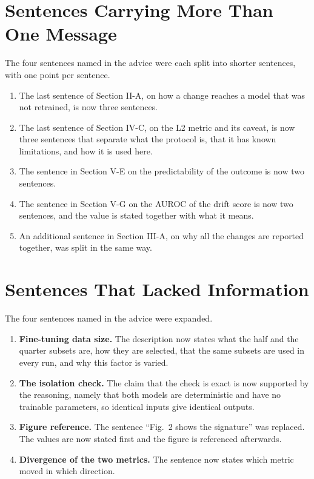 \documentclass[11pt,a4paper]{article}
\begin{document}
\section{Sentences Carrying More Than One Message}
The four sentences named in the advice were each split into shorter sentences,
with one point per sentence.

\begin{enumerate}[leftmargin=*]
\item The last sentence of Section II-A, on how a change reaches a model that was
not retrained, is now three sentences.
\item The last sentence of Section IV-C, on the L2 metric and its caveat, is now
three sentences that separate what the protocol is, that it has known limitations,
and how it is used here.
\item The sentence in Section V-E on the predictability of the outcome is now two
sentences.
\item The sentence in Section V-G on the AUROC of the drift score is now two
sentences, and the value is stated together with what it means.
\item An additional sentence in Section III-A, on why all the changes are reported
together, was split in the same way.
\end{enumerate}

\section{Sentences That Lacked Information}
The four sentences named in the advice were expanded.

\begin{enumerate}[leftmargin=*]
\item \textbf{Fine-tuning data size.} The description now states what the half and
the quarter subsets are, how they are selected, that the same subsets are used in
every run, and why this factor is varied.
\item \textbf{The isolation check.} The claim that the check is exact is now
supported by the reasoning, namely that both models are deterministic and have no
trainable parameters, so identical inputs give identical outputs.
\item \textbf{Figure reference.} The sentence ``Fig.~2 shows the signature'' was
replaced. The values are now stated first and the figure is referenced afterwards.
\item \textbf{Divergence of the two metrics.} The sentence now states which metric
moved in which direction.
\end{enumerate}
\end{document}
